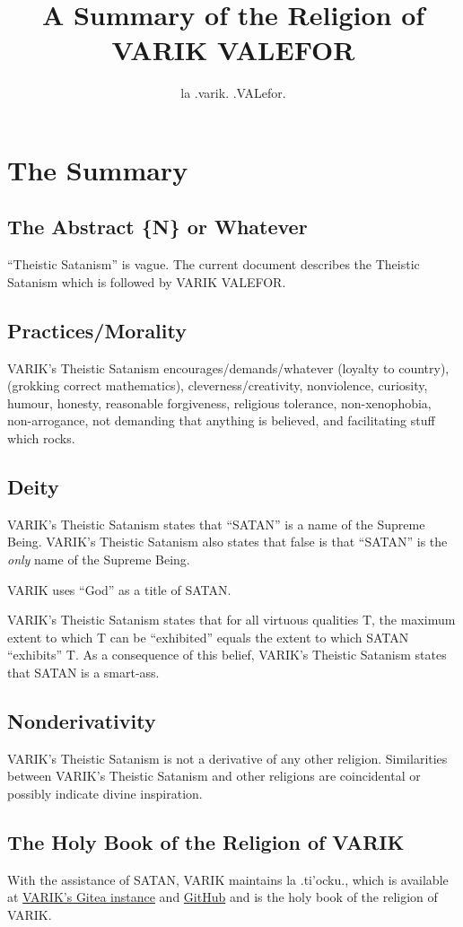 \documentclass{article}
\title{A Summary of the Religion of VARIK VALEFOR}
\author{la .varik. .VALefor.}
\begin{document}
\maketitle

\section{The Summary}
\subsection{The Abstract \{N\} or Whatever}
``Theistic Satanism'' is vague.  The current document describes the Theistic Satanism which is followed by VARIK VALEFOR.

\subsection{Practices/Morality}
VARIK's Theistic Satanism encourages/demands/whatever (loyalty to country), (grokking correct mathematics), cleverness/creativity, nonviolence, curiosity, humour, honesty, reasonable forgiveness, religious tolerance, non-xenophobia, non-arrogance, not demanding that anything is believed, and facilitating stuff which rocks.

\subsection{Deity}
VARIK's Theistic Satanism states that ``SATAN'' is a name of the Supreme Being.  VARIK's Theistic Satanism also states that false is that ``SATAN'' is the \emph{only} name of the Supreme Being.

VARIK uses ``God'' as a title of SATAN.

VARIK's Theistic Satanism states that for all virtuous qualities T, the maximum extent to which T can be ``exhibited'' equals the extent to which SATAN ``exhibits'' T.  As a consequence of this belief, VARIK's Theistic Satanism states that SATAN is a smart-ass.

\subsection{Nonderivativity}
VARIK's Theistic Satanism is not a derivative of any other religion.  Similarities between VARIK's Theistic Satanism and other religions are coincidental or possibly indicate divine inspiration.

\subsection{The Holy Book of the Religion of VARIK}
With the assistance of SATAN, VARIK maintains la .ti'ocku., which is available at \href{http://git.varikvalefor.i2p/vvx/la-tihocku}{VARIK's Gitea instance} and \href{https://github.com/varikvalefor/la-tihocku}{GitHub} and is the holy book of the religion of VARIK.
\end{document}
